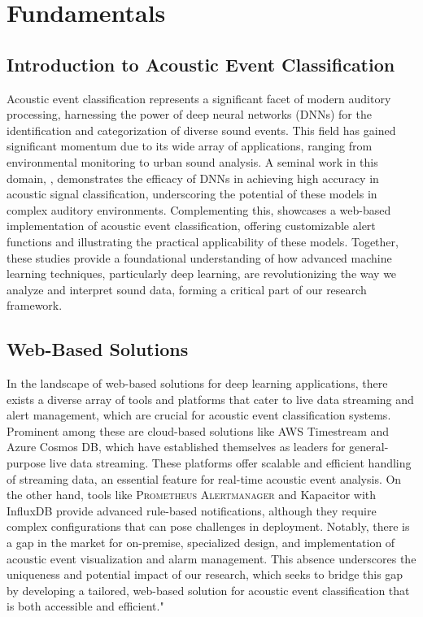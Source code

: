 \chapter{Fundamentals}
\section{Introduction to Acoustic Event Classification}

Acoustic event classification represents a significant facet of modern auditory processing, harnessing the power of deep neural networks (DNNs) for the identification and categorization of diverse sound events. This field has gained significant momentum due to its wide array of applications, ranging from environmental monitoring to urban sound analysis. A seminal work in this domain, \cite{sampath2020low}, demonstrates the efficacy of DNNs in achieving high accuracy in acoustic signal classification, underscoring the potential of these models in complex auditory environments. Complementing this, \cite{sampath2019realtime} showcases a web-based implementation of acoustic event classification, offering customizable alert functions and illustrating the practical applicability of these models. Together, these studies provide a foundational understanding of how advanced machine learning techniques, particularly deep learning, are revolutionizing the way we analyze and interpret sound data, forming a critical part of our research framework.

\section{Web-Based Solutions}

In the landscape of web-based solutions for deep learning applications, there exists a diverse array of tools and platforms that cater to live data streaming and alert management, which are crucial for acoustic event classification systems. Prominent among these are cloud-based solutions like AWS Timestream\cite{AWSTimestream} and Azure Cosmos DB\cite{AzureCosmos}, which have established themselves as leaders for general-purpose live data streaming. These platforms offer scalable and efficient handling of streaming data, an essential feature for real-time acoustic event analysis. On the other hand, tools like \textsc{Prometheus} \textsc{Alertmanager}\cite{AlertManager} and Kapacitor with InfluxDB\cite{kapacitor} provide advanced rule-based notifications, although they require complex configurations that can pose challenges in deployment. Notably, there is a gap in the market for on-premise, specialized design, and implementation of acoustic event visualization and alarm management. This absence underscores the uniqueness and potential impact of our research, which seeks to bridge this gap by developing a tailored, web-based solution for acoustic event classification that is both accessible and efficient."

